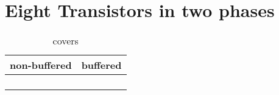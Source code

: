 \section{Eight Transistors in two phases}

\begin{table}[ht]
\centering
\caption*{covers}

\begin{tabular}{cc}
    \toprule
    non-buffered & buffered \\
    \midrule

    \nameref{cell:AOI22} & \nameref{cell:AO22} \\
    \nameref{cell:OAI22} & \nameref{cell:OA22} \\
    \nameref{cell:AOI31} & \nameref{cell:AO31} \\
    \nameref{cell:OAI31} & \nameref{cell:OA31}

\end{tabular}

\end{table}

 
 
 
 
